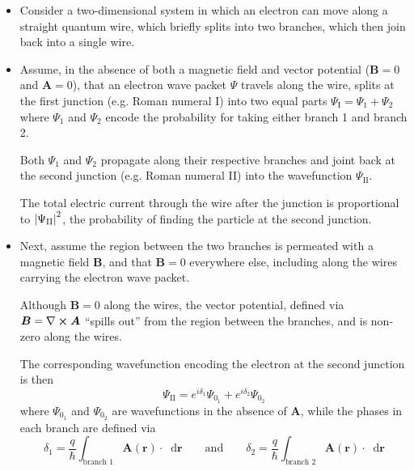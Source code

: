 \documentclass[11pt, a4paper]{article}
\newcommand{\diff}{\mathop{}\!\mathrm{d}} %
\renewcommand{\curl}{\nabla \cross}
\newcommand{\eqtext}[1]{\qquad \text{#1} \qquad}
\renewcommand{\vec}[1]{\bm{#1}}  %
\renewcommand{\r}{\vec{r}}  %
\newcommand{\A}{\vec{A}}  %
\newcommand{\B}{\vec{B}}  %
\renewcommand{\P}{\Psi}  %
\begin{document}
\begin{itemize}
	\item Consider a two-dimensional system in which an electron can move along a straight quantum wire, which briefly splits into two branches, which then join back into a single wire.
	
	\item Assume, in the absence of both a magnetic field and vector potential ($ \B = 0 $ and $ \A = 0 $), that an electron wave packet $ \P $ travels along the wire, splits at the first junction (e.g. Roman numeral I) into two equal parts $ \P_{\text{I}} = \P_{1} + \P_{2} $ where $ \P_{1} $ and $ \P_{2} $ encode the probability for taking either branch 1 and branch 2.
	
	Both $ \P_{1} $ and $ \P_{2} $ propagate along their respective branches and joint back at the second junction (e.g. Roman numeral II) into the wavefunction $ \P_{\text{II}} $.
	
	The total electric current through the wire after the junction is proportional to $ \abs{\P_{\text{II}}}^{2} $, the probability of finding the particle at the second junction.
	
	\item Next, assume the region between the two branches is permeated with a magnetic field $ \B $, and that $ \B = 0 $ everywhere else, including along the wires carrying the electron wave packet. 
	
	Although $ \B = 0 $ along the wires, the vector potential, defined via $ \B = \curl \A $ ``spills out'' from the region between the branches, and is non-zero along the wires. 
	
	The corresponding wavefunction encoding the electron at the second junction is then
	\begin{equation*}
		\P_{\text{II}} = e^{i\delta_{1}} \P_{0_{1}} + e^{i\delta_{2}}\P_{0_{2}}
	\end{equation*}
	where $ \P_{0_{1}} $ and $ \P_{0_{2}} $ are wavefunctions in the absence of $ \A $, while the phases in each branch are defined via
	\begin{equation*}
		\delta_{1} = \frac{q}{\hbar} \int_{\text{branch 1}} \A(\r) \cdot \diff \r \eqtext{and} \delta_{2} = \frac{q}{\hbar} \int_{\text{branch 2}} \A(\r) \cdot \diff \r
	\end{equation*}
	

\end{itemize}
\end{document}
